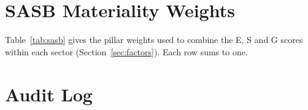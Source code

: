 \section{SASB Materiality Weights}
\label{app:sasb}

Table~\ref{tab:sasb} gives the pillar weights used to combine the E, S and G
scores within each sector (Section~\ref{sec:factors}). Each row sums to one.

\begin{table}[h]
\centering
\caption{Sector-specific E/S/G pillar weights, informed by the SASB
Materiality Map \cite{sasb_2023}.}
\label{tab:sasb}
\footnotesize

\end{table}

\section{Audit Log}
\label{app:audit}

